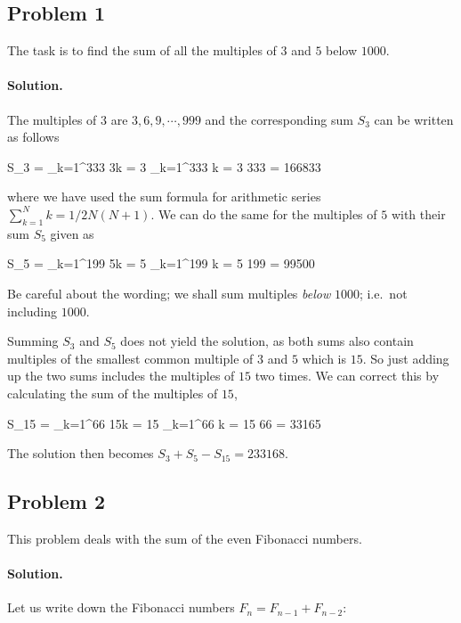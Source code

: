 
\subsection{Problem 1}

The task is to find the sum of all the multiples of $3$ and $5$ below $1000$.

\paragraph{Solution.} The multiples of $3$ are $3,6,9,\cdots,999$ and the corresponding sum $S_3$ can be written as follows

\bee
S_3 = \sum_{k=1}^{333} 3k = 3 \sum_{k=1}^{333} k = 3  333  = 166833
\eee

where we have used the sum formula for arithmetic series $\sum_{k=1}^N k = 1/2 N (N+1)$. We can do the same for the multiples of $5$ with their sum $S_5$ given as

\bee
S_5 = \sum_{k=1}^{199} 5k = 5 \sum_{k=1}^{199} k = 5  199  = 99500
\eee

Be careful about the wording; we shall sum multiples \emph{below} $1000$; i.e.\ not including $1000$.

Summing $S_3$ and $S_5$ does not yield the solution, as both sums also contain multiples of the smallest common multiple of $3$ and $5$ which is $15$. So just adding up the two sums includes the multiples of $15$ two times. We can correct this by calculating the sum of the multiples of $15$,

\bee
S_{15} = \sum_{k=1}^{66} 15k = 15 \sum_{k=1}^{66} k = 15  66  = 33165
\eee

The solution then becomes $S_3 + S_5 - S_{15} = 233168$.

\subsection{Problem 2}

This problem deals with the sum of the even Fibonacci numbers.

\paragraph{Solution.} Let us write down the Fibonacci numbers $F_n = F_{n-1} + F_{n-2}$:

